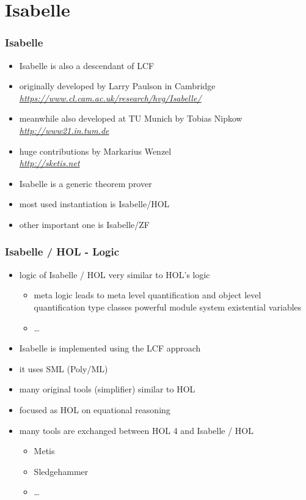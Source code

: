 \section{Isabelle}
\begin{frame}
\frametitle{Isabelle}

\begin{itemize}
\item Isabelle is also a descendant of LCF
\item originally developed by Larry Paulson in Cambridge\\
\emph{\url{https://www.cl.cam.ac.uk/research/hvg/Isabelle/}}
\item meanwhile also developed at TU Munich by Tobias Nipkow
\emph{\url{http://www21.in.tum.de}}
\item huge contributions by Markarius Wenzel\\
\emph{\url{http://sketis.net}}
\item Isabelle is a generic theorem prover
\item most used instantiation is Isabelle/HOL
\item other important one is Isabelle/ZF
\end{itemize}
\end{frame}


\begin{frame}
\frametitle{Isabelle / HOL - Logic}

\begin{itemize}
\item logic of Isabelle / HOL very similar to HOL's logic
\begin{itemize}
\item meta logic leads to meta level quantification and object level quantification
\pro type classes
\pro powerful module system
\pro existential variables
\item \ldots
\end{itemize}
\item Isabelle is implemented using the LCF approach
\item it uses SML (Poly/ML)
\item many original tools (\eg simplifier) similar to HOL
\item focused as HOL on equational reasoning
\item many tools are exchanged between HOL 4 and Isabelle / HOL
\begin{itemize}
\item Metis
\item Sledgehammer
\item \ldots
\end{itemize}
\end{itemize}
\end{frame}


